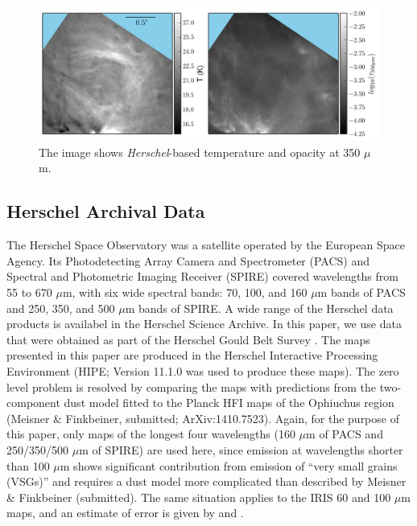 \documentclass[11pt,a4paper]{emulateapj}
\begin{document}
\begin{figure}[ht]
\centering
\includegraphics[scale=0.8]{fig/shell_herschel.png}
\caption{The image shows \textit{Herschel}-based temperature and opacity at 350 $\mu$m.
}
\end{figure}

\subsection{Herschel Archival Data}
The Herschel Space Observatory was a satellite operated by the European Space Agency. Its Photodetecting Array Camera and Spectrometer (PACS) and Spectral and Photometric Imaging Receiver (SPIRE) covered wavelengths from 55 to 670 $\mu$m, with six wide spectral bands: 70, 100, and 160 $\mu$m bands of PACS and 250, 350, and 500 $\mu$m bands of SPIRE. A wide range of the Herschel data products is availabel in the Herschel Science Archive. In this paper, we use data that were obtained as part of the Herschel Gould Belt Survey \citep{Andr__2010}. The maps presented in this paper are produced in the Herschel Interactive Processing Environment (HIPE; Version 11.1.0 was used to produce these maps). The zero level problem is resolved by comparing the maps with predictions from the two-component dust model fitted to the Planck HFI maps of the Ophiuchus region (Meisner \& Finkbeiner, submitted; ArXiv:1410.7523). Again, for the purpose of this paper, only maps of the longest four wavelengths (160 $\mu$m of PACS and 250/350/500 $\mu$m of SPIRE) are used here, since emission at wavelengths shorter than 100 $\mu$m shows significant contribution from emission of ``very small grains (VSGs)'' and requires a dust model more complicated than described by Meisner \& Finkbeiner (submitted). The same situation applies to the IRIS 60 and 100 $\mu$m maps, and an estimate of error is given by \citet{Schnee_2006} and \citet{Schnee_2007}.
\end{document}
